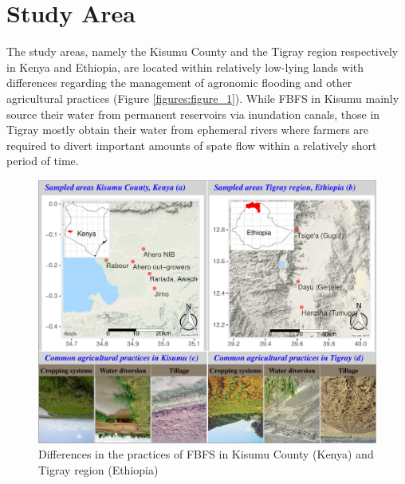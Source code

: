 \documentclass[12pt,oneside]{article}
\begin{document}
\hypertarget{study-area}{%
\section{Study Area}\label{study-area}}

The study areas, namely the Kisumu County and the Tigray region
respectively in Kenya and Ethiopia, are located within relatively
low-lying lands with differences regarding the management of agronomic
flooding and other agricultural practices (Figure
\ref{figures:figure_1}). While FBFS in Kisumu mainly source their water
from permanent reservoirs via inundation canals, those in Tigray mostly
obtain their water from ephemeral rivers where farmers are required to
divert important amounts of spate flow within a relatively short period
of time.

\begin{figure}
\includegraphics[width=1\linewidth]{figures/Modelling_FBFS_study_area} \caption{\label{figures:figure_1}Differences in the practices of FBFS in Kisumu County (Kenya) and Tigray region (Ethiopia)}\label{fig:figure_1}
\end{figure}
\end{document}
